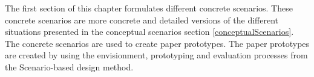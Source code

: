 The first section of this chapter formulates different concrete scenarios. These concrete scenarios are more concrete and detailed versions of the different situations presented in the conceptual scenarios section \cref{conceptualScenarios}. The concrete scenarios are used to create paper prototypes. The paper prototypes are created by using the envisionment, prototyping and evaluation processes from the Scenario-based design method.